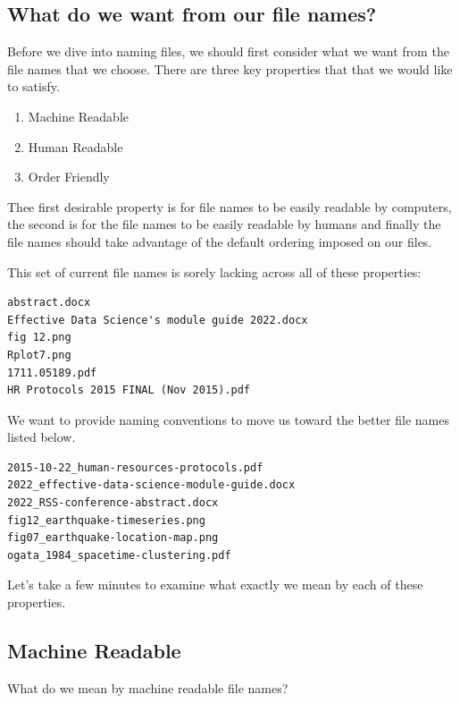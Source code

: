 \documentclass[
  12pt,
]{book}
\providecommand{\tightlist}{%
  \setlength{\itemsep}{0pt}\setlength{\parskip}{0pt}}
\begin{document}
\hypertarget{what-do-we-want-from-our-file-names}{%
\subsection{What do we want from our file names?}\label{what-do-we-want-from-our-file-names}}

Before we dive into naming files, we should first consider what we want from the file names that we choose. There are three key properties that that we would like to satisfy.

\begin{enumerate}
\def\labelenumi{\arabic{enumi}.}
\tightlist
\item
  Machine Readable
\item
  Human Readable
\item
  Order Friendly
\end{enumerate}

Thee first desirable property is for file names to be easily readable by computers, the second is for the file names to be easily readable by humans and finally the file names should take advantage of the default ordering imposed on our files.

This set of current file names is sorely lacking across all of these properties:

\begin{verbatim}
abstract.docx
Effective Data Science's module guide 2022.docx 
fig 12.png
Rplot7.png
1711.05189.pdf
HR Protocols 2015 FINAL (Nov 2015).pdf
\end{verbatim}

We want to provide naming conventions to move us toward the better file names listed below.

\begin{verbatim}
2015-10-22_human-resources-protocols.pdf
2022_effective-data-science-module-guide.docx
2022_RSS-conference-abstract.docx 
fig12_earthquake-timeseries.png 
fig07_earthquake-location-map.png
ogata_1984_spacetime-clustering.pdf
\end{verbatim}

Let's take a few minutes to examine what exactly we mean by each of these properties.

\hypertarget{machine-readable}{%
\subsection{Machine Readable}\label{machine-readable}}

What do we mean by machine readable file names?
\end{document}
